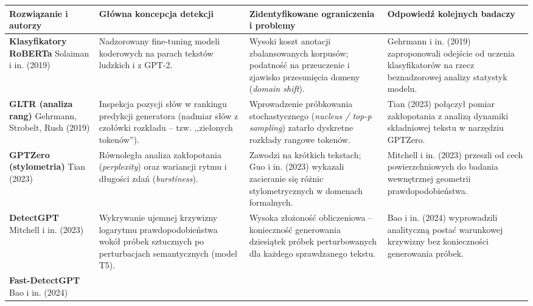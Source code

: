 \begin{table}[H]
\centering
\scriptsize
\begin{tabularx}{\textwidth}{|p{2.6cm}|X|X|X|}
\hline
\textbf{Rozwiązanie i autorzy} & \textbf{Główna koncepcja detekcji} & \textbf{Zidentyfikowane ograniczenia i problemy} & \textbf{Odpowiedź kolejnych badaczy} \\
\hline
\textbf{Klasyfikatory RoBERTa} \newline Solaiman i in. (2019) \cite{solaiman2019release} &
Nadzorowany fine-tuning modeli koderowych na parach tekstów ludzkich i z GPT-2. &
Wysoki koszt anotacji zbalansowanych korpusów; podatność na przeuczenie i zjawisko przesunięcia domeny (\textit{domain shift}). &
Gehrmann i in. (2019) \cite{gehrmann2019gltr} zaproponowali odejście od uczenia klasyfikatorów na rzecz beznadzorowej analizy statystyk modelu. \\
\hline
\textbf{GLTR (analiza rang)} \newline Gehrmann, Strobelt, Rush (2019) \cite{gehrmann2019gltr} &
Inspekcja pozycji słów w rankingu predykcji generatora (nadmiar słów z czołówki rozkładu -- tzw. ,,zielonych tokenów''). &
Wprowadzenie próbkowania stochastycznego (\textit{nucleus / top-p sampling}) zatarło dyskretne rozkłady rangowe tokenów. &
Tian (2023) \cite{gptzero2023} połączył pomiar zakłopotania z analizą dynamiki składniowej tekstu w narzędziu GPTZero. \\
\hline
\textbf{GPTZero (stylometria)} \newline Tian (2023) \cite{gptzero2023} &
Równoległa analiza zakłopotania (\textit{perplexity}) oraz wariancji rytmu i długości zdań (\textit{burstiness}). &
Zawodzi na krótkich tekstach; Guo i in. (2023) \cite{guo2023hc3} wykazali zacieranie się różnic stylometrycznych w domenach formalnych. &
Mitchell i in. (2023) \cite{mitchell2023detectgpt} przeszli od cech powierzchniowych do badania wewnętrznej geometrii prawdopodobieństwa. \\
\hline
\textbf{DetectGPT} \newline Mitchell i in. (2023) \cite{mitchell2023detectgpt} &
Wykrywanie ujemnej krzywizny logarytmu prawdopodobieństwa wokół próbek sztucznych po perturbacjach semantycznych (model T5). &
Wysoka złożoność obliczeniowa -- konieczność generowania dziesiątek próbek perturbowanych dla każdego sprawdzanego tekstu. &
Bao i in. (2024) \cite{bao2023fastdetectgpt} wyprowadzili analityczną postać warunkowej krzywizny bez konieczności generowania próbek. \\
\hline
\textbf{Fast-DetectGPT} \newline Bao i in. (2024) \cite{bao2023fastdetectgpt} &

\end{tabularx}
\end{table}
